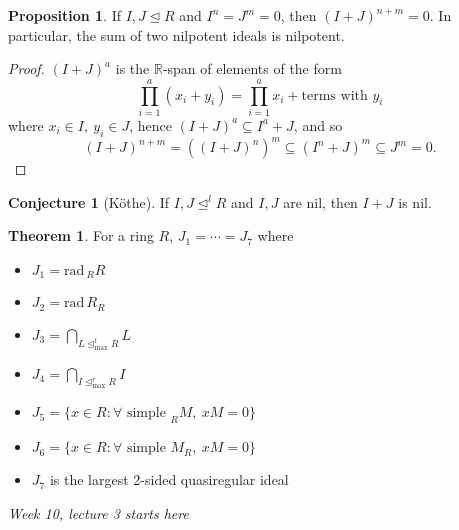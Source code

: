 \documentclass[a4paper]{article}
\newcommand{\R}{\mathbb{R}}
\newcommand{\rad}{\text{rad}\,}
\theoremstyle{definition}
\newtheorem{prop}[defn]{Proposition}
\newtheorem{thm}[defn]{Theorem}
\newtheorem*{conj}{Conjecture}
\begin{document}
\begin{prop}
If $I,J\unlhd R$ and $I^n=J^m=0$, then $(I+J)^{n+m}=0$. In particular, the sum of two nilpotent ideals is nilpotent.
\end{prop}
\begin{proof}
$(I+J)^a$ is the $\R$-span of elements of the form
\[
\prod_{i=1}^a(x_i+y_i)=\prod_{i=1}^a x_i+\text{terms with }y_i
\]
where $x_i\in I,\ y_i\in J$, hence $(I+J)^a\subseteq I^a+J$, and so
\[
(I+J)^{n+m}=((I+J)^n)^m\subseteq (I^n+J)^m\subseteq J^m=0.
\]
\end{proof}

\begin{conj}[Köthe]
If $I,J\unlhd^l R$ and $I,J$ are nil, then $I+J$ is nil.
\end{conj}

\begin{thm}
\label{thm:J1-7eq}
For a ring $R$, $J_1=\cdots=J_7$ where
\begin{itemize}
\item $J_1=\rad{}_RR$
\item $J_2=\rad R_R$
\item $\displaystyle J_3=\bigcap_{L\unlhd^l_{\text{max}}R} L$
\item $\displaystyle J_4=\bigcap_{I\unlhd^r_{\text{max}}R} I$
\item $J_5=\{x\in R:\forall\text{ simple }_RM,\ xM=0\}$
\item $J_6=\{x\in R:\forall\text{ simple }M_R,\ xM=0\}$
\item $J_7$ is the largest 2-sided quasiregular ideal
\end{itemize}
\end{thm}

\begin{flushright}
\textit{Week 10, lecture 3 starts here}
\end{flushright}
\end{document}
